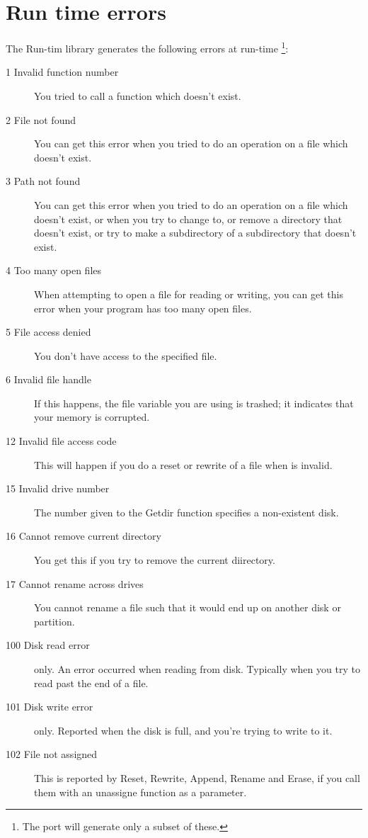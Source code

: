 \documentclass{report}
\begin{document}
\chapter{Run time errors}
The \fpk Run-tim library generates the following errors at run-time
\footnote{The \linux port will generate only a subset of these.}:

\begin{description}
\item [1  Invalid function number]
You tried to call a \dos function which doesn't exist.
\item [2  File not found]
You can get this error when you tried to do an operation on a file which
doesn't exist.
\item [3  Path not found]
You can get this error when you tried to do an operation on a file which
doesn't exist, or when you try to change to, or remove a directory that doesn't exist,
or try to make a subdirectory  of a subdirectory that doesn't exist.
\item [4  Too many open files]
When attempting to open a file for reading or writing, you can get this
error when your program has too many open files.
\item [5  File access denied]
You don't have access to the specified file.
\item [6  Invalid file handle]
If this happens, the file variable you are using is trashed; it
indicates that your memory is corrupted.
\item [12  Invalid file access code]
This will happen if you do a reset or rewrite of a file when 
is invalid. 
\item [15  Invalid drive number]
The number given to the Getdir function specifies a non-existent disk.
\item [16  Cannot remove current directory]
You get this if you try to remove the current diirectory.
\item [17  Cannot rename across drives]
You cannot rename a file such that it would end up on another disk or
partition.
\item [100  Disk read error]
\dos only. An error occurred when reading from disk. Typically when you try
to read past the end of a file.
\item [101  Disk write error]
\dos only. Reported when the disk is full, and you're trying to write to it.
\item [102  File not assigned]
This is reported by Reset, Rewrite, Append, Rename and Erase, if you call
them with an unassigne function as a parameter.

\end{description}
\end{document}
